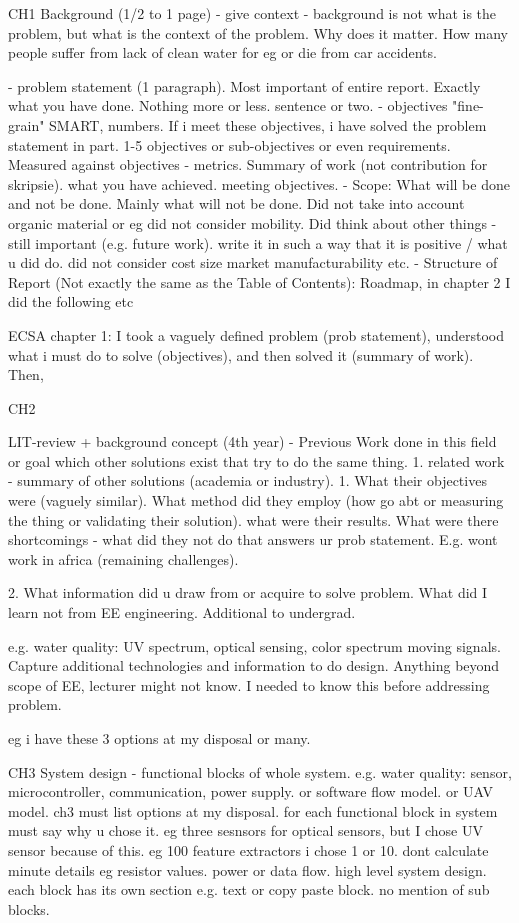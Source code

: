 CH1
 Background (1/2 to 1 page) - give context
- background is not what is the problem, but what is the context of the problem. Why does it matter. How many people suffer from lack of clean water for eg or die from car accidents. 

- problem statement (1 paragraph). Most important of entire report. Exactly what you have done. Nothing more or less. sentence or two. 
- objectives "fine-grain" SMART, numbers. If i meet these objectives, i have solved the problem statement in part. 1-5 objectives or sub-objectives or even requirements. Measured against objectives - metrics. 
Summary of work (not contribution for skripsie). what you have achieved. meeting objectives. 
- Scope: What will be done and not be done. Mainly what will not be done. Did not take into account organic material or eg did not consider mobility. Did think about other things - still important (e.g. future work). write it in such a way that it is positive  / what u did do. did not consider cost size market manufacturability etc. 
- Structure of Report (Not exactly the same as the Table of Contents): Roadmap, in chapter 2 I did the following etc

ECSA chapter 1: I took a vaguely defined problem (prob statement), understood what i must do to solve (objectives), and then solved it (summary of work).
Then, 


CH2

LIT-review + background concept (4th year)
- Previous Work done in this field or goal
which other solutions exist that try to do the same thing. 
1. related work - summary of other solutions (academia or industry). 1.  What their objectives were (vaguely similar). What method did they employ (how go abt or measuring the thing or validating their solution). what were their results. What were there shortcomings - what did they not do that answers ur prob statement. E.g. wont work in africa (remaining challenges).

2. What information did u draw from or acquire to solve problem. What did I learn not from EE engineering. Additional to undergrad. 

e.g. water quality: UV spectrum, optical sensing, color spectrum moving signals. Capture additional technologies and information to do design. Anything beyond scope of EE, lecturer might not know. I needed to know this before addressing problem. 


eg i have these 3 options at my disposal or many. 

CH3
System design - functional blocks of whole system. e.g. water quality: sensor, microcontroller, communication, power supply. or software flow model. or UAV model. ch3 must list options at my disposal.  for each functional block in system must say why u chose it. eg three sesnsors for optical sensors, but I chose UV sensor because of this. eg 100 feature extractors i chose 1 or 10. dont calculate minute details eg resistor values. power or data flow. 
high level system design. each block has its own section e.g. text or copy paste block. no mention of sub blocks. 

